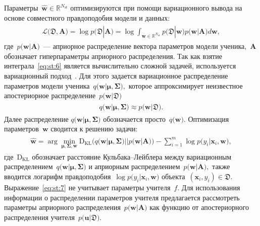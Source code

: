 \documentclass[12pt]{a&t}
\begin{document}
Параметры~$\hat{\mathbf{w}} \in \mathbb{R}^{N_{\text{st}}}$ оптимизируются при помощи вариационного вывода на основе совместного правдоподобия модели и данных:
\begin{gather}
\label{eq:st:6}
\begin{aligned}
\mathcal{L}\bigr(\mathfrak{D}, \mathbf{A}\bigr) = \log p\bigr(\mathfrak{D}|\mathbf{A}\bigr) = \log \int_{\mathbf{w} \in \mathbb{R}^{N_{\text{st}}}}p\bigr(\mathfrak{D}|\mathbf{w}\bigr)p\bigr(\mathbf{w}|\mathbf{A}\bigr)d\mathbf{w},
\end{aligned}
\end{gather}
где~$p\bigr(\mathbf{w}| \mathbf{A}\bigr)$~--- априорное распределение вектора параметров модели ученика,~$\mathbf{A}$ обозначает гиперпараметры априорного распределения.
Так как взятие интеграла~\eqref{eq:st:6} является вычислительно сложной задачей, используется вариационный подход~\cite{graves2011, grabovoy2019}. Для этого задается вариационное распределение параметров модели ученика~$q\bigr(\mathbf{w}|\bm{\mu}, \bm{\Sigma}\bigr),$ которое аппроксимирует неизвестное апостериорное распределение~$p\bigr(\mathbf{w}|\mathfrak{D}\bigr)$
\begin{gather}
\label{eq:st:new:1}
\begin{aligned}
q\bigr(\mathbf{w}|\bm{\mu}, \bm{\Sigma}\bigr) \approx  p\bigr(\mathbf{w}|\mathfrak{D}\bigr).
\end{aligned}
\end{gather}
Далее распределение $q\bigr(\mathbf{w}|\bm{\mu}, \bm{\Sigma}\bigr)$ обозначается просто~$q\bigr(\mathbf{w}\bigr).$ Оптимизация параметров~$\mathbf{w}$ сводится к решению  задачи:
\begin{gather}
\label{eq:st:7}
\begin{aligned}
\hat{\mathbf{w}} = \arg \min_{\bm{\mu}, \bm{\Sigma}, \mathbf{w}} \text{D}_{\text{KL}}\bigr(q\bigr(\mathbf{w}|\bm{\mu}, \bm{\Sigma}\bigr)||p\bigr(\mathbf{w}|\mathbf{A}\bigr)\bigr) - \sum_{i=1}^{m}\log p\bigr(y_i|\mathbf{x}_{i}, \mathbf{w}\bigr),
\end{aligned}
\end{gather}
где~$\text{D}_{\text{KL}}$ обозначает расстояние Кульбака--Лейблера между вариационным распределением~$q\bigr(\mathbf{w}|\bm{\mu}, \bm{\Sigma}\bigr)$ и априорным распределением~$p\bigr(\mathbf{w}|\mathbf{A}\bigr),$ также вводится логарифм правдоподобия~$\log p\bigr(y_i|\mathbf{x}_{i}, \mathbf{w}\bigr)$ объекта~$\left(\mathbf{x}_i, y_i\right) \in \mathfrak{D}.$
Выражение~\eqref{eq:st:7} не учитывает параметры учителя~$f$. Для использования информации о распределении параметров учителя предлагается рассмотреть параметры априорного распределения~$p\bigr(\mathbf{w}|\mathbf{A}\bigr)$ как функцию от апостериорного распределения учителя~$p\bigr(\mathbf{u}|\mathfrak{D}\bigr)$.
\end{document}
